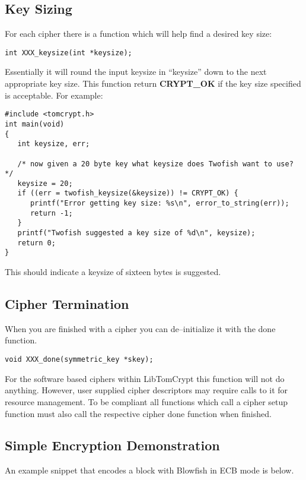 \documentclass[a4paper]{book}
\begin{document}
\subsection{Key Sizing}
For each cipher there is a function which will help find a desired key size:
\begin{verbatim}
int XXX_keysize(int *keysize);
\end{verbatim}
Essentially it will round the input keysize in ``keysize'' down to the next appropriate key size.  This function
return {\bf CRYPT\_OK} if the key size specified is acceptable.  For example:
\begin{small}
\begin{verbatim}
#include <tomcrypt.h>
int main(void)
{
   int keysize, err;

   /* now given a 20 byte key what keysize does Twofish want to use? */
   keysize = 20;
   if ((err = twofish_keysize(&keysize)) != CRYPT_OK) {
      printf("Error getting key size: %s\n", error_to_string(err));
      return -1;
   }
   printf("Twofish suggested a key size of %d\n", keysize);
   return 0;
}
\end{verbatim}
\end{small}
This should indicate a keysize of sixteen bytes is suggested.  

\subsection{Cipher Termination}
When you are finished with a cipher you can de--initialize it with the done function.
\begin{verbatim}
void XXX_done(symmetric_key *skey);
\end{verbatim}
For the software based ciphers within LibTomCrypt this function will not do anything.  However, user supplied
cipher descriptors may require calls to it for resource management.  To be compliant all functions which call a cipher
setup function must also call the respective cipher done function when finished.

\subsection{Simple Encryption Demonstration}
An example snippet that encodes a block with Blowfish in ECB mode is below.
\end{document}
